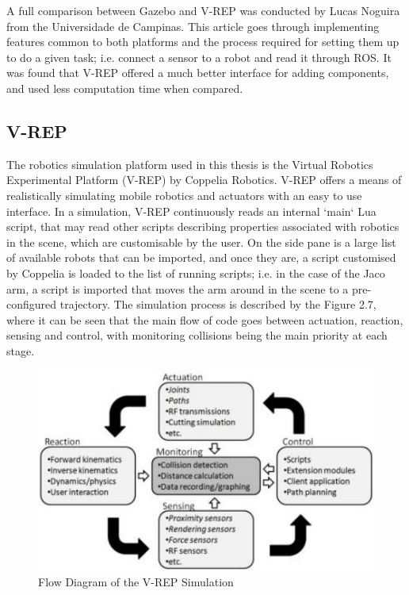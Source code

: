 \documentclass[12pt,openany,a4paper]{book}
\begin{document}
A full comparison between Gazebo and V-REP was conducted by Lucas Noguira from the Universidade de Campinas. This article goes through implementing features common to both platforms and the process required for setting them up to do a given task; i.e. connect a sensor to a robot and read it through ROS. It was found that V-REP offered a much better interface for adding components, and used less computation time when compared. 

\subsection{V-REP}
The robotics simulation platform used in this thesis is the Virtual Robotics Experimental Platform (V-REP) by Coppelia Robotics. V-REP offers a means of realistically simulating mobile robotics and actuators with an easy to use interface. In a simulation, V-REP continuously reads an internal `main` Lua script, that may read other scripts describing properties associated with robotics in the scene, which are customisable by the user. On the side pane is a large list of available robots that can be imported, and once they are, a script customised by Coppelia is loaded to the list of running scripts; i.e. in the case of the Jaco arm, a script is imported that moves the arm around in the scene to a pre-configured trajectory. The simulation process is described by the Figure 2.7, where it can be seen that the main flow of code goes between actuation, reaction, sensing and control, with monitoring collisions being the main priority at each stage.

\begin{center}
\begin{figure}[htb]
  \includegraphics[width=\linewidth]{vrep_simulation_diagram.jpg}
\caption{Flow Diagram of the V-REP Simulation}
\end{figure}
\end{center}
\end{document}
